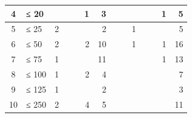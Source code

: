 {\begin{table}
\begin{tabular}{
	c
	l
	r r c
	r r c
	r r c
	r r
	r
}
4
	& ≤ 20
	& %
	& %
	& %
	& 1 %
	& 3 %
	& %
	& %
	& %
	& %
	& %
	& 1 %
	& 5
	\\

\midrule

5
	& ≤ 25
	& 2 %
	& %
	& %
	& %
	& 2 %
	& %
	& %
	& 1 %
	& %
	& %
	& %
	& 5
	\\

\midrule

6
	& ≤ 50
	& 2 %
	& %
	& %
	& 2 %
	& 10 %
	& %
	& %
	& 1 %
	& %
	& %
	& 1 %
	& 16
	\\

\midrule

7
	& ≤ 75
	& 1 %
	& %
	& %
	& %
	& 11 %
	& %
	& %
	& %
	& %
	& %
	& 1 %
	& 13
	\\

\midrule

8
	& ≤ 100
	& 1 %
	& %
	& %
	& 2 %
	& 4 %
	& %
	& %
	& %
	& %
	& %
	& %
	& 7
	\\

\midrule

9
	& ≤ 125
	& 1 %
	& %
	& %
	& %
	& 2 %
	& %
	& %
	& %
	& %
	& %
	& %
	& 3
	\\

\midrule

10
	& ≤ 250
	& 2 %
	& %
	& %
	& 4 %
	& 5 %
	& %
	& %
	& %
	& %
	& %
	& %
	& 11
	\\


\end{tabular}
\end{table}}
